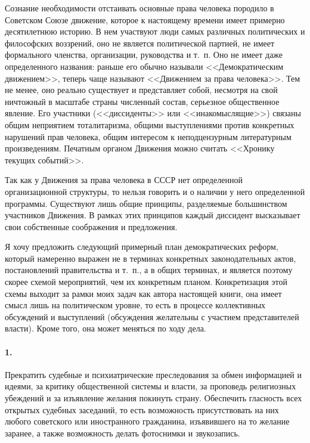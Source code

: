 \documentclass{book}
\begin{document}
Сознание необходимости отстаивать основные права челове­ка породило в Советском Союзе движение, которое к насто­ящему времени имеет примерно десятилетнюю историю. В нем участвуют люди самых различных политических и философ­ских воззрений, оно не является политической партией, не имеет формального членства, организации, руководства и т.~п. Оно не имеет даже определенного названия: раньше его обычно назы­вали <<Демократическим движением>>, теперь чаще называют <<Движением за права человека>>. Тем не менее, оно реально су­ществует и представляет собой, несмотря на свой ничтожный в масштабе страны численный состав, серьезное общественное явление. Его участники (<<диссиденты>> или <<инакомыслящие>>) связаны общим неприятием тоталитаризма, общими выступле­ниями против конкретных нарушений прав человека, общим интересом к неподцензурным литературным произведениям. Печатным органом Движения можно считать <<Хронику текущих событий>>.

Так как у Движения за права человека в СССР нет определен­ной организационной структуры, то нельзя говорить и о нали­чии у него определенной программы. Существуют лишь общие принципы, разделяемые большинством участников Движения. В рамках этих принципов каждый диссидент высказывает свои собственные соображения и предложения.

Я хочу предложить следующий примерный план демократи­ческих реформ, который намеренно выражен не в терминах конкретных законодательных актов, постановлений прави­тельства и т.~п., а в общих терминах, и является поэтому ско­рее схемой мероприятий, чем их конкретным планом. Конкре­тизация этой схемы выходит за рамки моих задач как автора настоящей книги, она имеет смысл лишь на политическом уровне, то есть в процессе коллективных обсуждений и вы­ступлений (обсуждения желательны с участием представите­лей власти). Кроме того, она может меняться по ходу дела.

\paragraph{1.} Прекратить судебные и психиатрические преследования за обмен информацией и идеями, за критику общественной системы и власти, за проповедь религиозных убеждений и за изъявление желания покинуть страну. Обеспечить гласность всех открытых судебных заседаний, то есть возможность при­сутствовать на них любого советского или иностранного граж­данина, изъявившего на то желание заранее, а также возмож­ность делать фотоснимки и звукозапись.
\end{document}
